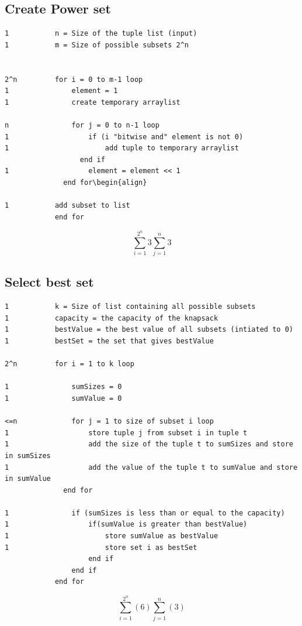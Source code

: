 \documentclass{inc/mas}
\begin{document}
\subsection{Create Power set}

\begin{lstlisting}
1			n = Size of the tuple list (input)
1			m = Size of possible subsets 2^n


2^n			for i = 0 to m-1 loop	
1				element = 1	
1				create temporary arraylist
	  
n				for j = 0 to n-1 loop	
1					if (i "bitwise and" element is not 0)
1						add tuple to temporary arraylist
				  end if
1					element = element << 1
			  end for\begin{align}
	
1			add subset to list
			end for
\end{lstlisting}

\begin{equation}
\sum^{2^n}_{i =1}3\sum^n_{j=1}3%
\end{equation}


\subsection{Select best set}

\begin{lstlisting}
1			k = Size of list containing all possible subsets
1			capacity = the capacity of the knapsack
1			bestValue = the best value of all subsets (intiated to 0)
1			bestSet = the set that gives bestValue

2^n			for i = 1 to k loop

1				sumSizes = 0
1				sumValue = 0

<=n				for j = 1 to size of subset i loop
1					store tuple j from subset i in tuple t
1					add the size of the tuple t to sumSizes and store in sumSizes
1					add the value of the tuple t to sumValue and store in sumValue
			  end for

1				if (sumSizes is less than or equal to the capacity)
1					if(sumValue is greater than bestValue)
1						store sumValue as bestValue
1						store set i as bestSet
					end if
				end if
			end for
\end{lstlisting}


\begin{equation}
\sum^{2^n}_{i=1}(6)\sum^n_{j=1}(3)
\end{equation}
\end{document}
